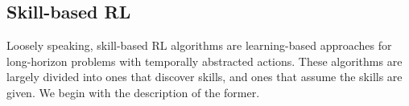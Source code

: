 

\subsection{Skill-based RL}
\iffalse

Loosely speaking, skill-based RL algorithms are learning-based approaches for long-horizon problems with temporally abstracted actions. These algorithms are largely divided into ones that discover skills, and ones that assume the skills are given. We begin with the description of the former. 

